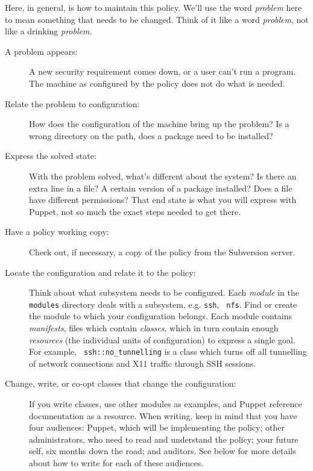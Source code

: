 Here, in general, is how to maintain this policy. We'll use the word
\emph{problem} here to mean something that needs to be changed. Think of
it like a word \emph{problem}, not like a drinking \emph{problem}.

\begin{description}

\item[A problem appears:]
A new security requirement comes down, or a user can't run a program. The
machine as configured by the policy does not do what is needed.

\item[Relate the problem to configuration:]
How does the configuration of the machine bring up the problem? Is a wrong
directory on the path, does a package need to be installed?

\item[Express the solved state:]
With the problem solved, what's different about the system? Is there an
extra line in a file? A certain version of a package installed? Does a
file have different permissions? That end state is what you will express
with Puppet, not so much the exact steps needed to get there.

\item[Have a policy working copy:]
Check out, if necessary, a copy of the policy from the Subversion server.

\item[Locate the configuration and relate it to the policy:]
Think about what subsystem needs to be configured. Each \emph{module} in
the {\tt modules} directory deals with a subsystem, e.g. {\tt ssh}, {\tt
nfs}. Find or create the module to which your configuration belongs. Each
module contains \emph{manifests}, files which contain \emph{classes},
which in turn contain enough \emph{resources} (the individual units of
configuration) to express a single goal. For example, {\tt
ssh::no\_tunnelling} is a class which turns off all tunnelling of network
connections and X11 traffic through SSH sessions.

\item[Change, write, or co-opt classes that change the configuration:]
If you write classes, use other modules as examples, and Puppet
reference documentation as a resource. When writing, keep in mind that you
have four audiences: Puppet, which will be implementing the policy; other
administrators, who need to read and understand the policy; your future
self, six months down the road; and auditors. See below for more details
about how to write for each of these audiences.


\end{description}

